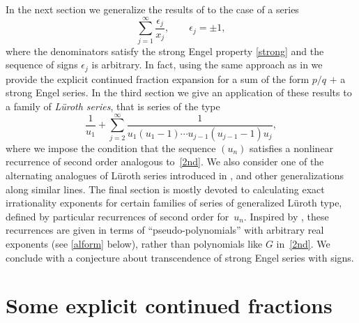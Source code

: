 \documentclass[12pt,a4paper]{amsart}
\theoremstyle{definition}
\numberwithin{equation}{section}
\newcommand\eps{{\epsilon}}
\begin{document}
In the next section we generalize the results of \cite{Hone2} to the case of a series 
\begin{equation}
\label{rndsign} 
\sum_{j=1}^\infty \frac{\eps_j}{x_j}, \qquad \eps_j=\pm 1, 
\end{equation} 
where the denominators satisfy the strong Engel property \eqref{strong} and the sequence of signs 
$\eps_j$ is arbitrary. In fact, using the same approach as in \cite{HoneVar} we provide the explicit continued 
fraction expansion for a sum of the form $p/q$ $+$ a strong Engel series. In the third section we give an application of these results 
to a family of \textit{L\"uroth series}, that is series of the type 
\begin{equation}
\label{luroth} 
\frac{1}{u_1} +\sum_{j=2}^{\infty} \frac{1}{u_{1}(u_{1}-1) \cdots 
  u_{j-1}(u_{j-1}-1) u_{j}}, 
\end{equation} 
where we impose the condition that the sequence $(u_n)$ satisfies a nonlinear recurrence of second order analogous to~\eqref{2nd}. We also 
consider one of the alternating analogues of L\"uroth series introduced in \cite{kkk}, and 
other generalizations along similar lines. The final section is mostly devoted to calculating exact irrationality exponents for 
certain families of series of generalized L\"uroth type, 
defined by particular recurrences of second order for~$u_n$. 
Inspired by \cite{DKS2}, these recurrences are given in terms of ``pseudo-polynomials'' with arbitrary real exponents 
(see \eqref{alform} below), 
rather than polynomials like $G$ in~\eqref{2nd}. 
We conclude with a  
conjecture about transcendence 
of strong Engel series with signs. 


\section{Some explicit continued fractions} 
\label{sec:ecf}
\end{document}
